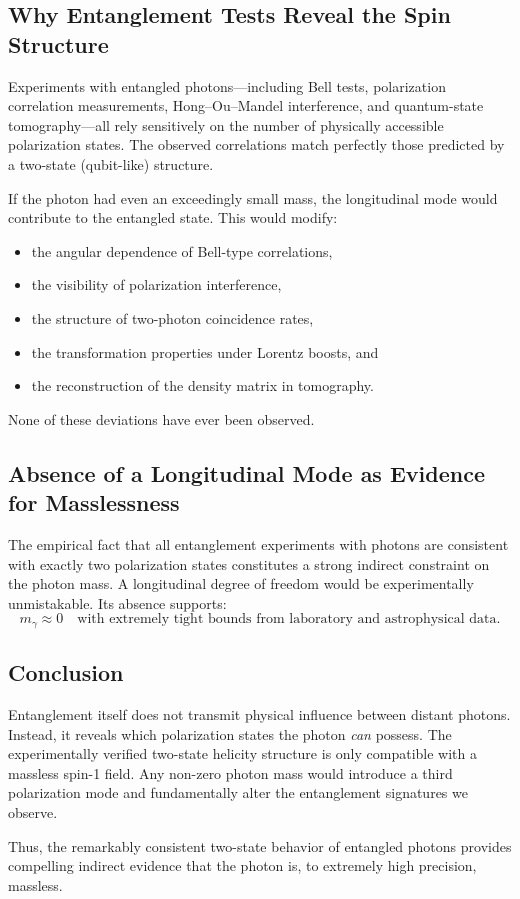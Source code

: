 \subsection*{Why Entanglement Tests Reveal the Spin Structure}
Experiments with entangled photons---including Bell tests, polarization 
correlation measurements, Hong--Ou--Mandel interference, and 
quantum-state tomography---all rely sensitively on the number of physically 
accessible polarization states. The observed correlations match perfectly 
those predicted by a two-state (qubit-like) structure. 

If the photon had even an exceedingly small mass, the longitudinal mode 
would contribute to the entangled state. This would modify:
\begin{itemize}
	\item the angular dependence of Bell-type correlations,
	\item the visibility of polarization interference,
	\item the structure of two-photon coincidence rates,
	\item the transformation properties under Lorentz boosts, and
	\item the reconstruction of the density matrix in tomography.
\end{itemize}
None of these deviations have ever been observed.

\subsection*{Absence of a Longitudinal Mode as Evidence for Masslessness}
The empirical fact that all entanglement experiments with photons are 
consistent with exactly two polarization states constitutes a strong 
indirect constraint on the photon mass. A longitudinal degree of freedom 
would be experimentally unmistakable. Its absence supports:
\[
m_\gamma \approx 0
\quad\text{with extremely tight bounds from laboratory and astrophysical data}.
\]

\subsection*{Conclusion}
Entanglement itself does not transmit physical influence between distant 
photons. Instead, it reveals which polarization states the photon 
\emph{can} possess. The experimentally verified two-state helicity 
structure is only compatible with a massless spin-1 field. Any non-zero 
photon mass would introduce a third polarization mode and fundamentally 
alter the entanglement signatures we observe.

Thus, the remarkably consistent two-state behavior of entangled photons 
provides compelling indirect evidence that the photon is, to extremely 
high precision, massless.
